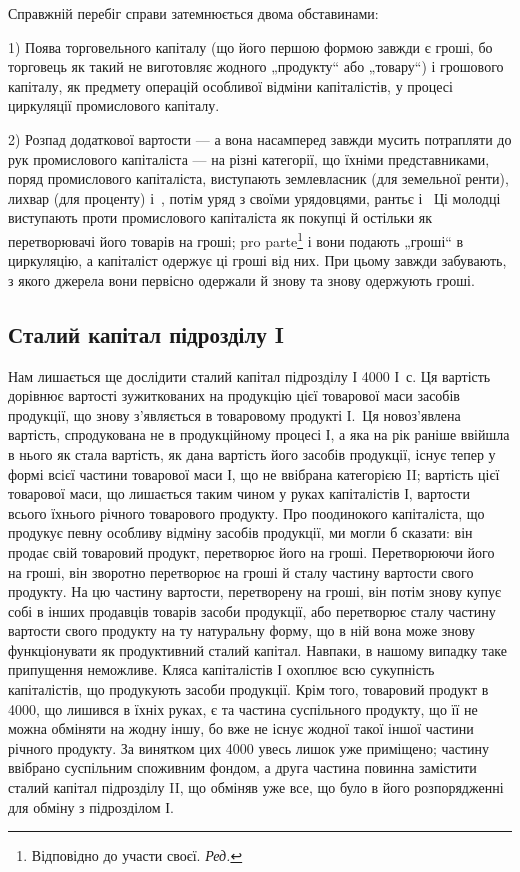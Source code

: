 
Справжній перебіг справи затемнюється двома обставинами:

1) Поява торговельного капіталу (що його першою формою
завжди є гроші, бо торговець як такий не виготовляє жодного
„продукту“ або „товару“) і грошового капіталу, як предмету
операцій особливої відміни капіталістів, у процесі циркуляції промислового
капіталу.

2) Розпад додаткової вартости — а вона насамперед завжди мусить
потрапляти до рук промислового капіталіста — на різні категорії, що їхніми
представниками, поряд промислового капіталіста, виступають землевласник
(для земельної ренти), лихвар (для проценту) і~, потім уряд з своїми
урядовцями, рантьє і~ Ці молодці виступають проти промислового
капіталіста як покупці й остільки як перетворювачі його товарів на гроші;
pro parte\footnote*{
Відповідно до участи своєї. \emph{Ред.}
} і вони подають „гроші“ в циркуляцію, а капіталіст одержує
ці гроші від них. При цьому завжди забувають, з якого джерела вони
первісно одержали й знову та знову одержують гроші.
\label{original-325-1}

\subsection[Сталий капітал підрозділу I]{Сталий капітал підрозділу I\footnotemark{}}

\label{original-325-2}
Нам
лишається ще дослідити сталий капітал підрозділу І \deq{} 4000 І~$с$.
Ця вартість дорівнює вартості зужиткованих на продукцію цієї товарової
маси засобів продукції, що знову з’являється в товаровому продукті І.~Ця новоз’явлена вартість, спродукована не в продукційному процесі І, а
яка на рік раніше ввійшла в нього як стала вартість, як дана вартість
його засобів продукції, існує тепер у формі всієї частини товарової маси І,
що не ввібрана категорією II; вартість цієї товарової маси, що лишається
таким чином у руках капіталістів І, \deq{}  вартости всього їхнього річного
товарового продукту. Про поодинокого капіталіста, що продукує певну
особливу відміну засобів продукції, ми могли б сказати: він продає свій
товаровий продукт, перетворює його на гроші. Перетворюючи його на
гроші, він зворотно перетворює на гроші й сталу частину вартости свого
продукту. На цю частину вартости, перетворену на гроші, він потім знову
купує собі в інших продавців товарів засоби продукції, або перетворює
сталу частину вартости свого продукту на ту натуральну форму, що
в ній вона може знову функціонувати як продуктивний сталий капітал.
Навпаки, в нашому випадку таке припущення неможливе. Кляса капіталістів
І охоплює всю сукупність капіталістів, що продукують засоби продукції.
Крім того, товаровий продукт в 4000, що лишився в їхніх руках,
є та частина суспільного продукту, що її не можна обміняти на жодну
іншу, бо вже не існує жодної такої іншої частини річного продукту. За
винятком цих 4000 увесь лишок уже приміщено; частину ввібрано суспільним
споживним фондом, а друга частина повинна замістити сталий
капітал підрозділу II, що обміняв уже все, що було в його розпорядженні
для обміну з підрозділом І.
\parbreak{}  %
